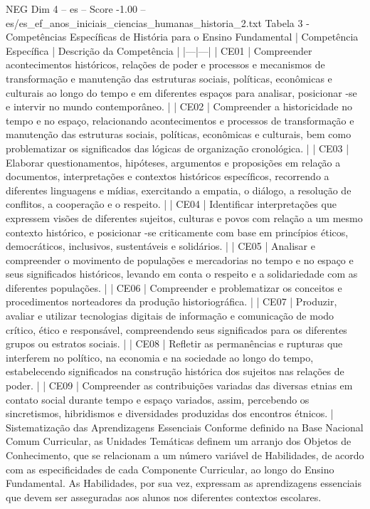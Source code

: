 \begin{textsample}{NEG Dim 4 – es – Score -1.00 – es/es\_ef\_anos\_iniciais\_ciencias\_humanas\_historia\_2.txt}
Tabela 3 - Competências Específicas de História para o Ensino Fundamental | Competência Específica | Descrição da Competência | |---|---| | CE01 | Compreender acontecimentos históricos, relações de poder e processos e mecanismos de transformação e manutenção das estruturas sociais, políticas, econômicas e culturais ao longo do tempo e em diferentes espaços para analisar, posicionar -se e intervir no mundo contemporâneo. | | CE02 | Compreender a historicidade no tempo e no espaço, relacionando acontecimentos e processos de transformação e manutenção das estruturas sociais, políticas, econômicas e culturais, bem como problematizar os significados das lógicas de organização cronológica. | | CE03 | Elaborar questionamentos, hipóteses, argumentos e proposições em relação a documentos, interpretações e contextos históricos específicos, recorrendo a diferentes linguagens e mídias, exercitando a empatia, o diálogo, a resolução de conflitos, a cooperação e o respeito. | | CE04 | Identificar interpretações que expressem visões de diferentes sujeitos, culturas e povos com relação a um mesmo contexto histórico, e posicionar -se criticamente com base em princípios éticos, democráticos, inclusivos, sustentáveis e solidários. | | CE05 | Analisar e compreender o movimento de populações e mercadorias no tempo e no espaço e seus significados históricos, levando em conta o respeito e a solidariedade com as diferentes populações. | | CE06 | Compreender e problematizar os conceitos e procedimentos norteadores da produção historiográfica. | | CE07 | Produzir, avaliar e utilizar tecnologias digitais de informação e comunicação de modo crítico, ético e responsável, compreendendo seus significados para os diferentes grupos ou estratos sociais. | | CE08 | Refletir as permanências e rupturas que interferem no político, na economia e na sociedade ao longo do tempo, estabelecendo significados na construção histórica dos sujeitos nas relações de poder. | | CE09 | Compreender as contribuições variadas das diversas etnias em contato social durante tempo e espaço variados, assim, percebendo os sincretismos, hibridismos e diversidades produzidas dos encontros étnicos. | Sistematização das Aprendizagens Essenciais Conforme definido na Base Nacional Comum Curricular, as Unidades Temáticas definem um arranjo dos Objetos de Conhecimento, que se relacionam a um número variável de Habilidades, de acordo com as especificidades de cada Componente Curricular, ao longo do Ensino Fundamental.
As Habilidades, por sua vez, expressam as aprendizagens essenciais que devem ser asseguradas aos alunos nos diferentes contextos escolares.

\end{textsample}
